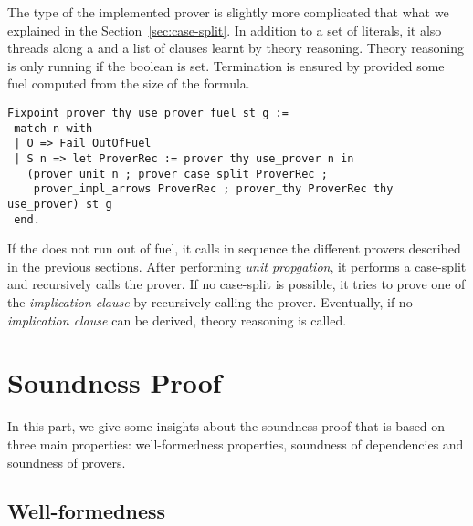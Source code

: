 \documentclass[a4paper,UKenglish,cleveref, autoref, thm-restate]{lipics-v2019}
\begin{document}
The type of the implemented prover is slightly more complicated that what we explained in the Section~\ref{sec:case-split}.
In addition to a set of literals, it also threads along a  and a list of clauses learnt by theory reasoning.
Theory reasoning is only running if the boolean  is set.
%
Termination is ensured by provided some fuel computed from the size of the formula. 
\begin{verbatim}
Fixpoint prover thy use_prover fuel st g :=
 match n with
 | O => Fail OutOfFuel
 | S n => let ProverRec := prover thy use_prover n in
   (prover_unit n ; prover_case_split ProverRec ;
    prover_impl_arrows ProverRec ; prover_thy ProverRec thy use_prover) st g
 end.
\end{verbatim}
If the  does not run out of fuel, it calls in sequence
the different provers described in the previous sections.  After
performing \emph{unit propgation}, it performs a case-split and
recursively calls the prover. If no case-split is possible, it tries
to prove one of the \emph{implication clause} by recursively calling
the prover. Eventually, if no \emph{implication clause} can be
derived, theory reasoning is called.

\section{Soundness Proof}
\label{sec:soundness-proof}
In this part, we give some insights about the soundness proof that is
based on three main properties: well-formedness properties, soundness of
dependencies and soundness of provers.

\subsection{Well-formedness}
\end{document}
